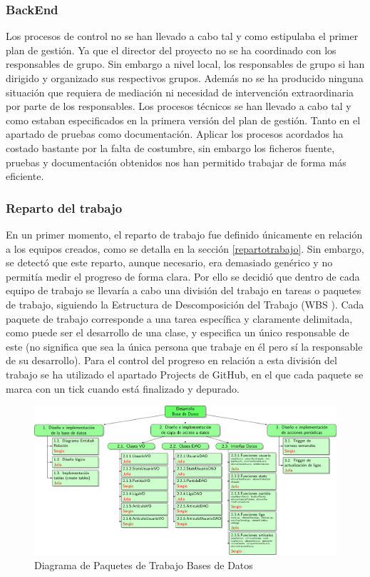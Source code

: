\subsubsection*{BackEnd}
Los procesos de control no se han llevado a cabo tal y como estipulaba el primer plan de gestión. Ya que el director del proyecto no se ha coordinado con los responsables de grupo. Sin embargo a nivel local, los responsables de grupo si han dirigido y organizado sus respectivos grupos. Además no se ha producido ninguna situación que requiera de mediación ni necesidad de intervención extraordinaria por parte de los responsables. 
Los procesos técnicos se han llevado a cabo tal y como estaban especificados en la primera versión del plan de gestión. Tanto en el apartado de pruebas como documentación. Aplicar los procesos acordados ha costado bastante por la falta de costumbre, sin embargo los ficheros fuente, pruebas y documentación obtenidos nos han permitido trabajar de forma más eficiente.

\subsubsection{Reparto del trabajo}
En un primer momento, el reparto de trabajo fue definido únicamente en relación a los equipos creados, como se detalla en la sección \ref{repartotrabajo}. Sin embargo, se detectó que este reparto, aunque necesario, era demasiado genérico y no permitía medir el progreso de forma clara. Por ello se decidió que dentro de cada equipo de trabajo se llevaría a cabo una división del trabajo en tareas o paquetes de trabajo, siguiendo la Estructura de Descomposición del Trabajo (WBS \cite{edt}). Cada paquete de trabajo corresponde a una tarea específica y claramente delimitada, como puede ser el desarrollo de una clase, y especifica un único responsable de este (no significa que sea la única persona que trabaje en él pero sí la responsable de su desarrollo). Para el control del progreso en relación a esta división del trabajo se ha utilizado el apartado Projects de GitHub, en el que cada paquete se marca con un tick cuando está finalizado y depurado.
\begin{figure}[H]
		\hspace{-2cm}
		\includegraphics[scale=0.8]{figuras/edtBasesDatos.pdf}
		\caption{Diagrama de Paquetes de Trabajo Bases de Datos}
	\end{figure}

